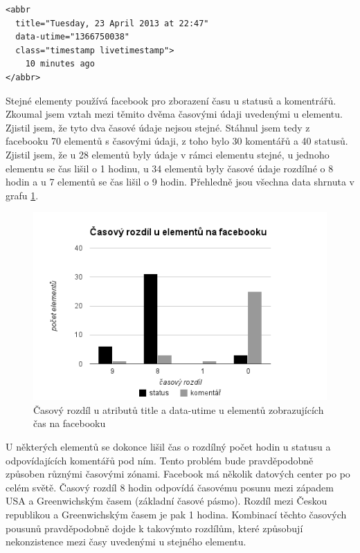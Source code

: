 \documentclass[thesis=M,czech]{FITthesis}[2013/05/10]
\begin{document}
\begin{lstlisting}[caption={Příklad elementu obsahující čas},label=lst:timeElement,belowcaptionskip=0.4cm]
<abbr 
  title="Tuesday, 23 April 2013 at 22:47"
  data-utime="1366750038" 
  class="timestamp livetimestamp">
    10 minutes ago
</abbr>
\end{lstlisting}

Stejné elementy používá facebook pro zborazení času u statusů a komentrářů. Zkoumal jsem vztah mezi těmito dvěma časovými údaji uvedenými u elementu. Zjistil jsem, že tyto dva časové údaje nejsou stejné. Stáhnul jsem tedy z facebooku 70 elementů s časovými údaji, z toho bylo 30 komentářů a 40 statusů. Zjistil jsem, že u 28 elementů byly údaje v rámci elementu stejné, u jednoho elementu se čas lišil o 1 hodinu, u 34 elementů byly časové údaje rozdílné o 8 hodin a u 7 elementů se čas lišil o 9 hodin. Přehledně jsou všechna data shrnuta v grafu \ref{fig:timeDifference}.

\begin{figure}[h]
\begin{center}
\includegraphics[width=5in]{figures/time-difference.png}
\caption{Časový rozdíl u atributů title a data-utime u elementů zobrazujících čas na facebooku}
\label{fig:timeDifference}
\end{center}
\end{figure}

U některých elementů se dokonce lišil čas o rozdílný počet hodin u statusu a odpovídajících komentářů pod ním. Tento problém bude pravděpodobně způsoben různými časovými zónami. Facebook má několik datových center po  po celém světě. Časový rozdíl 8 hodin odpovídá časovému posunu mezi západem USA a Greenwichským časem (základní časové pásmo). Rozdíl mezi Českou republikou a Greenwichským časem je pak 1 hodina. Kombinací těchto časových pousunů pravděpodobně dojde k takovýmto rozdílům, které způsobují nekonzistence mezi časy uvedenými u stejného elementu. 
\end{document}
